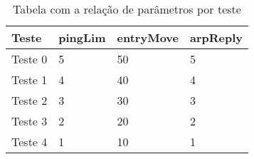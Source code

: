 \begin{table}[h!]
    \centering
    \begin{tabular}{ | l | l | l | l |}
    \hline
    \textbf{Teste} & \textbf{pingLim} & \textbf{entryMove} &
    \textbf{arpReply} \\ 
    \hline
    \hline Teste 0 & 5 & 50 & 5 \\ 
    \hline Teste 1 & 4 & 40 & 4 \\ 
    \hline Teste 2 & 3 & 30 & 3 \\ 
    \hline Teste 3 & 2 & 20 & 2 \\
    \hline Teste 4 & 1 & 10 & 1 \\
    \hline
    \end{tabular}
    \caption{Tabela com a relação de parâmetros por teste}
    \label{tbl:host_tracker-experiment}
\end{table}
